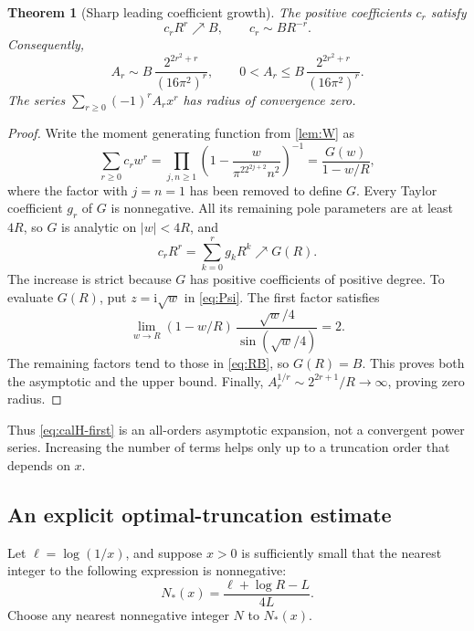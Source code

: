 \documentclass[11pt,a4paper]{article}
\numberwithin{equation}{section}
\newtheorem{theorem}{Theorem}[section]
\theoremstyle{definition}
\theoremstyle{remark}
\newcommand{\ii}{\mathrm i}
\newcommand{\abs}[1]{\left|#1\right|}
\begin{document}
\begin{theorem}[Sharp leading coefficient growth]
\label{thm:c-asymptotic}
The positive coefficients $c_r$ satisfy
\begin{equation}
 c_rR^r\nearrow B,
 \qquad
 c_r\sim BR^{-r}.
 \label{eq:c-asymptotic}
\end{equation}
Consequently,
\begin{equation}
 A_r\sim B\,\frac{2^{2r^2+r}}{(16\pi^2)^r},
 \qquad
 0<A_r\le B\,\frac{2^{2r^2+r}}{(16\pi^2)^r}.
 \label{eq:A-asymptotic}
\end{equation}
The series $\sum_{r\ge0}(-1)^rA_rx^r$ has radius of convergence zero.
\end{theorem}
\begin{proof}
Write the moment generating function from \cref{lem:W} as
\[
 \sum_{r\ge0}c_rw^r
 =\prod_{j,n\ge1}\left(1-\frac{w}{\pi^22^{2j+2}n^2}\right)^{-1}
 =\frac{G(w)}{1-w/R},
\]
where the factor with $j=n=1$ has been removed to define $G$.
Every Taylor coefficient $g_r$ of $G$ is nonnegative. All its
remaining pole parameters are at least $4R$, so $G$ is analytic
on $\abs w<4R$, and
\[
 c_rR^r=\sum_{k=0}^rg_kR^k\nearrow G(R).
\]
The increase is strict because $G$ has positive coefficients of
positive degree. To evaluate $G(R)$, put $z=\ii\sqrt w$ in
\cref{eq:Psi}. The first factor satisfies
\[
 \lim_{w\to R}(1-w/R)\,
 \frac{\sqrt w/4}{\sin(\sqrt w/4)}=2.
\]
The remaining factors tend to those in \cref{eq:RB}, so $G(R)=B$.
This proves both the asymptotic and the upper bound. Finally,
$A_r^{1/r}\sim 2^{2r+1}/R\to\infty$, proving zero radius.
\end{proof}

Thus \cref{eq:calH-first} is an all-orders asymptotic expansion, not
a convergent power series. Increasing the number of terms helps only
up to a truncation order that depends on $x$.

\subsection{An explicit optimal-truncation estimate}
Let $\ell=\log(1/x)$, and suppose $x>0$ is sufficiently small that
the nearest integer to the following expression is nonnegative:
\begin{equation}
 N_*(x)=\frac{\ell+\log R-L}{4L}.
 \label{eq:Nstar}
\end{equation}
Choose any nearest nonnegative integer $N$ to $N_*(x)$.
\end{document}
